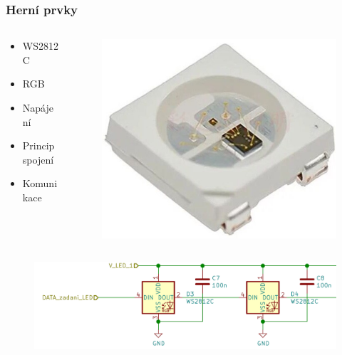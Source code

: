 \documentclass[%
  12pt,       				%
	t,                  %
	aspectratio=1610,   %
	unicode,						%
]{beamer}				    	%
\begin{document}
\begin{frame} 
	\frametitle{Herní prvky}
	\begin{columns}[T] 								%
		\begin{column}{0.4\textwidth}		%
			\vspace{0.5cm}
			\begin{itemize}
				\item WS2812C
				\item RGB
				\item Napájení
				\item Princip spojení
				\item Komunikace
			\end{itemize}
		\end{column}
		\begin{column}{0.7\textwidth}		%
			\begin{figure}%
				\centering
				\includegraphics[width=0.3\columnwidth]{obrazky/WS2812C.jpg}
			\end{figure}
		\end{column}
	\end{columns}	
	
	\begin{figure}%
		\centering
		\vspace{0.5cm}	              %
		\includegraphics[width=0.9\columnwidth]{obrazky/2_LED_WS2812C.png}
	\end{figure}%
\end{frame}
\end{document}
